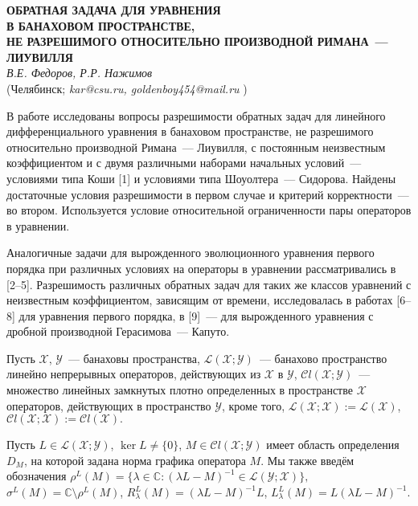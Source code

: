 \begin{center}{ \bf  ОБРАТНАЯ ЗАДАЧА ДЛЯ  УРАВНЕНИЯ\\ В БАНАХОВОМ ПРОСТРАНСТВЕ,\\ НЕ РАЗРЕШИМОГО ОТНОСИТЕЛЬНО ПРОИЗВОДНОЙ РИМАНА~--- ЛИУВИЛЛЯ}\\
{\it В.Е. Федоров, Р.Р. Нажимов } \\
(Челябинск; {\it kar@csu.ru, goldenboy454@mail.ru} )
\end{center}

В работе исследованы вопросы  разрешимости обратных задач для линейного дифференциального уравнения в банаховом пространстве, не разрешимого относительно производной Римана~--- Лиувилля, с постоянным неизвестным коэффициентом и с двумя различными наборами начальных условий~--- условиями типа Коши [1] и условиями типа Шоуолтера~--- Сидорова. Найдены достаточные условия разрешимости в первом случае и критерий корректности~--- во втором. Используется условие относительной ограниченности пары операторов в уравнении.

Аналогичные задачи для вырожденного эволюционного уравнения первого порядка при различных условиях на операторы в уравнении рассматривались в [2--5]. Разрешимость различных обратных задач для таких же классов уравнений с неизвестным коэффициентом, зависящим от времени, исследовалась в работах [6--8] для уравнения первого порядка, в [9]~--- для вырожденного уравнения с дробной производной Герасимова~--- Капуто.

Пусть ${\mathcal  X}$, ${\mathcal  Y}$~--- банаховы пространства, ${\mathcal L}(\mathcal X; \mathcal Y)$~--- банахово пространство линейно непрерывных операторов, действующих из $\mathcal X$ в $\mathcal Y$,
${\mathcal C}l({ \mathcal X; \mathcal Y})$~--- множество линейных замкнутых плотно определенных в пространстве ${\mathcal X}$ операторов, действующих в пространство ${\mathcal Y}$, кроме того,
 ${\mathcal L}(\mathcal X; \mathcal X):={\mathcal L}(\mathcal X)$,  ${\mathcal C}l(\mathcal X;\mathcal X):={\mathcal C}l(\mathcal X).$

Пусть
$L\in{\mathcal  L}({\mathcal  X};{\mathcal  Y})$, $\ker L\ne\{0\}$, $M\in{\mathcal  C}l({\mathcal  X;\mathcal Y})$ имеет область определения $D_M$, на которой задана норма графика оператора $M$. Мы также введём обозначения $\rho^L(M)=\{\lambda\in\mathbb C:
(\lambda L-M)^{-1}\in{\mathcal  L(\mathcal Y;\mathcal X)}\},$ $\sigma^L(M)=\mathbb C\setminus\rho^L(M)$,  $R_\lambda^L(M)=(\lambda L-M)^{-1}L$, $L_\lambda^L(M)=L(\lambda L-M)^{-1}.$

